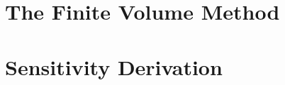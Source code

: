 \newcommand{\mainpath}{/home/lukas/Desktop/project/independence/project/thesis/}



\graphicspath{{fig/}{../fig/}}
\usepackage{subfiles}

\usepackage[subpreambles=false]{standalone}

\usepackage{import}

%



\makenomenclature


\setlength{\delimitershortfall}{0pt}

\fancyhead[RO]{\fancyplain{}{\Author}}
\fancyhead[LO]{\fancyplain{}{\thesistype:\ \shorttitle}}









\cleardoublepage

\fancyhead[RO,LE,LO]{\fancyplain{}{}}
\fancyhead[CE]{\fancyplain{}{\leftmark}}
\fancyhead[CO]{\fancyplain{}{\rightmark}}



%
%
%


\section{The Finite Volume Method}
\section{Sensitivity Derivation}


\cleardoublepage
\appendix{}


